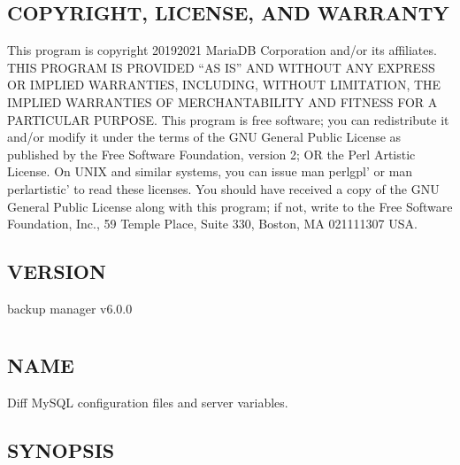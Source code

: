 \documentclass[letterpaper,10pt,english]{sphinxmanual}
\begin{document}
\section{COPYRIGHT, LICENSE, AND WARRANTY}
\label{\detokenize{mariadb-backup-manager:copyright-license-and-warranty}}
\sphinxAtStartPar
This program is copyright 2019\sphinxhyphen{}2021 MariaDB Corporation and/or its affiliates.
THIS PROGRAM IS PROVIDED “AS IS” AND WITHOUT ANY EXPRESS OR IMPLIED
WARRANTIES, INCLUDING, WITHOUT LIMITATION, THE IMPLIED WARRANTIES OF
MERCHANTABILITY AND FITNESS FOR A PARTICULAR PURPOSE.
This program is free software; you can redistribute it and/or modify it under
the terms of the GNU General Public License as published by the Free Software
Foundation, version 2; OR the Perl Artistic License.  On UNIX and similar
systems, you can issue \textasciigrave{}man perlgpl’ or \textasciigrave{}man perlartistic’ to read these
licenses.
You should have received a copy of the GNU General Public License along with
this program; if not, write to the Free Software Foundation, Inc., 59 Temple
Place, Suite 330, Boston, MA  02111\sphinxhyphen{}1307  USA.


\section{VERSION}
\label{\detokenize{mariadb-backup-manager:version}}
\sphinxAtStartPar
backup manager v6.0.0


\chapter{}
\label{\detokenize{mariadb-config-diff:mariadb-config-diff}}\label{\detokenize{mariadb-config-diff::doc}}

\section{NAME}
\label{\detokenize{mariadb-config-diff:name}}
\sphinxAtStartPar
{} \sphinxhyphen{} Diff MySQL configuration files and server variables.


\section{SYNOPSIS}
\label{\detokenize{mariadb-config-diff:synopsis}}
\end{document}
